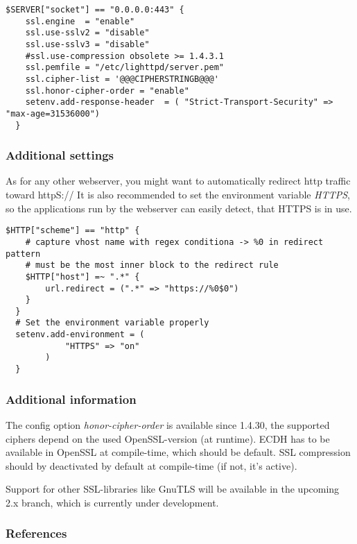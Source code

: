 
\begin{lstlisting}[breaklines]
  $SERVER["socket"] == "0.0.0.0:443" {
    ssl.engine  = "enable"
    ssl.use-sslv2 = "disable"
    ssl.use-sslv3 = "disable"
    #ssl.use-compression obsolete >= 1.4.3.1
    ssl.pemfile = "/etc/lighttpd/server.pem"
    ssl.cipher-list = '@@@CIPHERSTRINGB@@@'
    ssl.honor-cipher-order = "enable"
    setenv.add-response-header  = ( "Strict-Transport-Security" => "max-age=31536000")
  }
\end{lstlisting}


\subsubsection{Additional settings}

As for any other webserver, you might want to automatically redirect http
traffic toward httpS:// It is also recommended to set the environment variable
\emph{HTTPS}, so the applications run by the webserver can easily detect, that
HTTPS is in use.



\begin{lstlisting}[breaklines]
  $HTTP["scheme"] == "http" {
    # capture vhost name with regex conditiona -> %0 in redirect pattern
    # must be the most inner block to the redirect rule
    $HTTP["host"] =~ ".*" {
        url.redirect = (".*" => "https://%0$0")
    }
  }
  # Set the environment variable properly
  setenv.add-environment = (
            "HTTPS" => "on"
        )
  }
\end{lstlisting}


\subsubsection{Additional information} 
The config option \emph{honor-cipher-order} is available since 1.4.30, the
supported ciphers depend on the used OpenSSL-version (at runtime). ECDH has to
be available in OpenSSL at compile-time, which should be default. SSL
compression should by deactivated by default at compile-time (if not, it's
active).

Support for other SSL-libraries like GnuTLS will be available in the upcoming
2.x branch, which is currently under development.


\subsubsection{References} 

